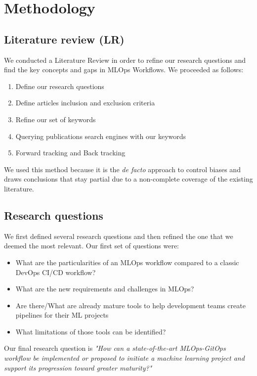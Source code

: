 \section{Methodology}\label{sec:methodo}
\subsection{Literature review (LR)}\label{subsec:literature-review-(lr)}

We conducted a Literature Review in order to refine our research questions and find the key concepts and gaps in MLOps Workflows.
We proceeded as follows:

\begin{enumerate}
    \item Define our research questions
    \item Define articles inclusion and exclusion criteria
    \item Refine our set of keywords
    \item Querying publications search engines with our keywords
    \item Forward tracking and Back tracking
\end{enumerate}

We used this method because it is the \textit{de facto} approach to control biases and draws conclusions that stay partial due to
a non-complete coverage of the existing literature.

\subsection{Research questions}\label{subsec:research-questions}

We first defined several research questions and then refined the one that we deemed the most relevant.
Our first set of questions were:
\begin{itemize}
    \item What are the particularities of an MLOps workflow compared to a classic DevOps CI/CD workflow?
    \item What are the new requirements and challenges in MLOps?
    \item Are there/What are already mature tools to help development teams create pipelines for their ML projects
    \item What limitations of those tools can be identified?
\end{itemize}

Our final research question is
\textit{"How can a state-of-the-art MLOps-GitOps workflow be implemented or proposed to initiate a machine learning project and support its progression toward greater maturity?"} %

